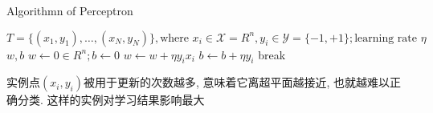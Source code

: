 \documentclass[11pt, a4paper]{article}
\begin{document}
  \begin{algorithm}
    \caption{Algorithmn of Perceptron}
    \begin{algorithmic}[1] %
      \REQUIRE $T=\{(x_1,y_1),\dots,(x_N,y_N)\},\text{where }x_i \in \mathcal{X} = R^n,y_i \in \mathcal{Y} = \{-1, +1\}; \text{learning rate }\eta$
      \ENSURE $w, b$
      \STATE $w \leftarrow 0 \in R^n; b \leftarrow 0$
            \STATE $w \leftarrow w + \eta y_i x_i$
            \STATE $b \leftarrow b + \eta y_i$
          \ENDIF
        \ENDFOR
          \STATE break
        \ENDIF
      \ENDWHILE
    \end{algorithmic}
  \end{algorithm}
  实例点$(x_i,y_i)$被用于更新的次数越多, 意味着它离超平面越接近, 也就越难以正确分类. 这样的实例对学习结果影响最大
\end{document}
